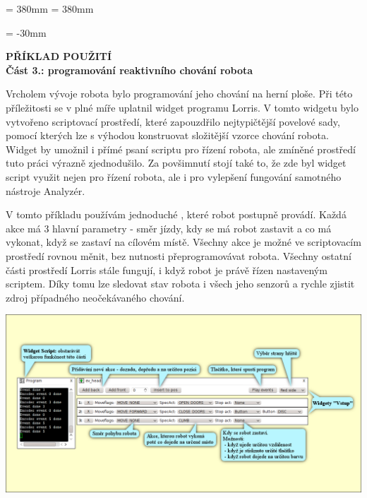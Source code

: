 \documentclass[17pt]{extreport}
\newcommand{\B}{\textbf} %
\begin{document}
\textheight = 380mm
\textwidth = 380mm
\newpage
\enlargethispage{400mm} %
\begin{landscape}
\voffset = -30mm %
\begin{center}
    \Large \B{PŘÍKLAD POUŽITÍ \\ Část 3.: programování reaktivního chování robota}
\end{center}
\vspace{5mm}
Vrcholem vývoje robota bylo programování jeho chování na herní ploše. Při této příležitosti se v plné míře uplatnil widget  programu Lorris. V tomto widgetu bylo vytvořeno scriptovací prostředí, které zapouzdřilo nejtypičtější povelové sady, pomocí kterých lze s výhodou konstruovat složitější vzorce chování robota. Widget  by umožnil i přímé psaní scriptu pro řízení robota, ale zmíněné prostředí tuto práci výrazně zjednodušilo. Za povšimnutí stojí také to, že zde byl widget script využit nejen pro řízení robota, ale i pro vylepšení fungování samotného nástroje Analyzér.  
 
V tomto příkladu používám jednoduché , které robot postupně provádí. Každá akce má 3 hlavní parametry - směr jízdy, kdy se má robot zastavit a co má vykonat, když se zastaví na cílovém místě. Všechny akce je možné ve scriptovacím prostředí rovnou měnit, bez nutnosti přeprogramovávat robota. Všechny ostatní části prostředí Lorris stále fungují, i když robot je právě řízen nastaveným scriptem. Díky tomu lze sledovat stav robota i všech jeho senzorů a rychle zjistit zdroj případného neočekávaného chování. 
\begin{center}
\includegraphics{img/control2.png}
\end{center}
\end{landscape}
\end{document}
